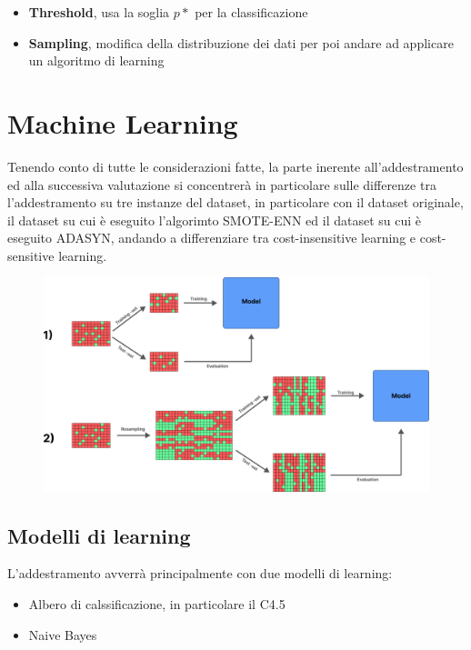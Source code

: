 \documentclass[italian,12pt,a4paper]{article}
\begin{document}
	\begin{itemize}
		\item \textbf{Threshold}, usa la soglia $p*$ per la classificazione
		\item \textbf{Sampling}, modifica della distribuzione dei dati per poi andare ad applicare un algoritmo di learning
	\end{itemize}
	
	\section{Machine Learning}
	Tenendo conto di tutte le considerazioni fatte, la parte inerente all'addestramento ed alla successiva valutazione si concentrerà in particolare sulle differenze tra l'addestramento su tre instanze del dataset, in particolare con il dataset originale, il dataset su cui è eseguito l'algorimto SMOTE-ENN ed il dataset su cui è eseguito ADASYN, andando a differenziare tra cost-insensitive learning e cost-sensitive learning.
	
	
		\begin{figure}[!h]
			\centering
			\includegraphics[width=15cm]{metodology_graph}
		\end{figure}
		
	\subsection{Modelli di learning}
	L'addestramento avverrà principalmente con due modelli di learning:
	
	\begin{itemize}
		\item Albero di calssificazione, in particolare il C4.5
		\item Naive Bayes
	\end{itemize}
	   
\end{document}
